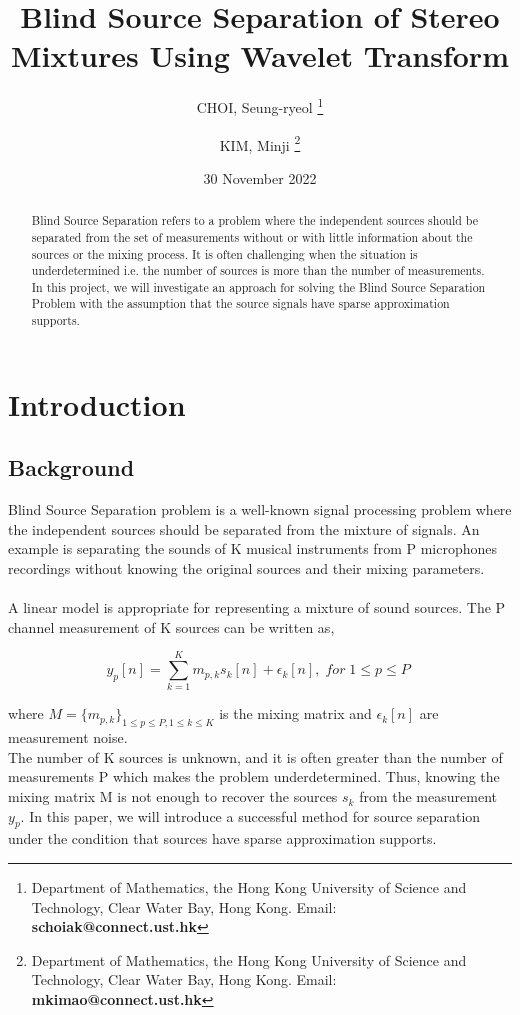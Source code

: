 \documentclass[a4paper,11pt]{article}
\title{Blind Source Separation of Stereo Mixtures Using Wavelet Transform}
\author{
CHOI, Seung-ryeol \thanks{Department of Mathematics, the Hong Kong University of Science and Technology, Clear Water Bay, Hong Kong. Email: {\bf schoiak@connect.ust.hk}}
\and
KIM, Minji \thanks{Department of Mathematics, the Hong Kong University of Science and Technology, Clear Water Bay, Hong Kong. Email: {\bf mkimao@connect.ust.hk}}  
}
\date{30 November 2022}
\begin{document}
\thispagestyle{plain}
\maketitle


\begin{abstract}
Blind Source Separation refers to a problem where the independent sources should be separated from the set of measurements without or with little information about the sources or the mixing process. It is often challenging when the situation is underdetermined i.e. the number of sources is more than the number of measurements. In this project, we will investigate an approach for solving the Blind Source Separation Problem with the assumption that the source signals have sparse approximation supports.
\end{abstract}

\section{Introduction}

\subsection{Background}
Blind Source Separation problem is a well-known signal processing problem where the independent sources should be separated from the mixture of signals. An example is separating the sounds of K musical instruments from P microphones recordings without knowing the original sources and their mixing parameters.
\\ \\
\noindent A linear model is appropriate for representing a mixture of sound sources. The P channel measurement of K sources can be written as,

\begin{equation}
    y_p[n] = \sum \limits _{{k=1 }}^{K}{m_{p,k}}{s_k[n]} + \epsilon_k[n], \;for \;   1\leqslant{p}\leqslant{P} \;
\end{equation}

\noindent where $ M = \{m_{p,k}\}_{1\leq p \leq P, 1\leq k \leq K} $ is the mixing matrix and $\epsilon_k[n]$ are measurement noise.
\\

\noindent The number of K sources is unknown, and it is often greater than the number of measurements P which makes the problem underdetermined. Thus, knowing the mixing matrix M is not enough to recover the sources $s_k$ from the measurement $y_p$.
In this paper, we will introduce a successful method for source separation under the condition that sources have sparse approximation supports.
\end{document}
